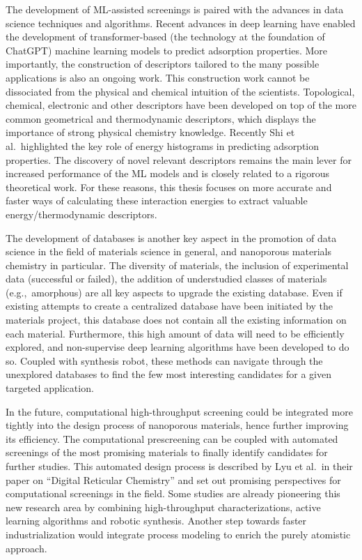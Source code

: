 \documentclass[main.tex]{subfiles}
\begin{document}
The development of ML-assisted screenings is paired with the advances in data science techniques and algorithms. Recent advances in deep learning have enabled the development of transformer-based (the technology at the foundation of ChatGPT) machine learning models to predict adsorption properties.\autocite{Kang_2023,Cao_2023} More importantly, the construction of descriptors tailored to the many possible applications is also an ongoing work. This construction work cannot be dissociated from the physical and chemical intuition of the scientists. Topological, chemical, electronic and other descriptors have been developed on top of the more common geometrical and thermodynamic descriptors, which displays the importance of strong physical chemistry knowledge. Recently Shi et al.\ highlighted the key role of energy histograms in predicting adsorption properties.\autocite{Shi_2023}
The discovery of novel relevant descriptors remains the main lever for increased performance of the ML models and is closely related to a rigorous theoretical work.
For these reasons, this thesis focuses on more accurate and faster ways of calculating these interaction energies to extract valuable energy/thermodynamic descriptors.


The development of databases is another key aspect in the promotion of data science in the field of materials science in general, and nanoporous materials chemistry in particular. The diversity of materials, the inclusion of experimental data (successful or failed), the addition of understudied classes of materials (e.g.,\ amorphous) are all key aspects to upgrade the existing database. Even if existing attempts to create a centralized database have been initiated by the materials project,\autocite{MaterialsProject} this database does not contain all the existing information on each material. Furthermore, this high amount of data will need to be efficiently explored, and non-supervise deep learning algorithms have been developed to do so.\autocite{Park_2023} Coupled with synthesis robot, these methods can navigate through the unexplored databases to find the few most interesting candidates for a given targeted application.

In the future, computational high-throughput screening could be integrated more tightly into the design process of nanoporous materials, hence further improving its efficiency. The computational prescreening can be coupled with automated screenings of the most promising materials to finally identify candidates for further studies. This automated design process is described by Lyu et al.\ in their paper on ``Digital Reticular Chemistry'' and set out promising perspectives for computational screenings in the field.\autocite{Lyu_2020} Some studies are already pioneering this new research area by combining high-throughput characterizations, active learning algorithms and robotic synthesis.\autocite{Greenaway_2018,Moosavi_2019} Another step towards faster industrialization would integrate process modeling to enrich the purely atomistic approach.
\end{document}

